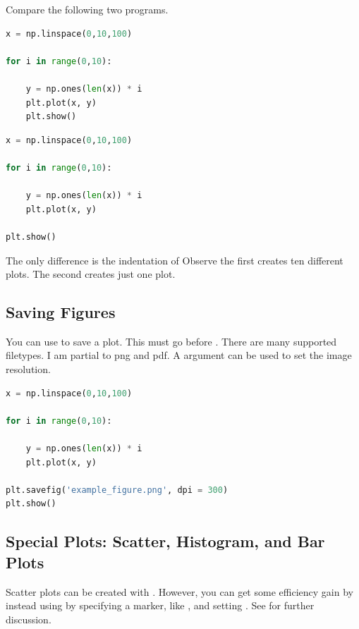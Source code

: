 Compare the following two programs.

\begin{lstlisting}[language = Python]
x = np.linspace(0,10,100)

for i in range(0,10):
    
    y = np.ones(len(x)) * i
    plt.plot(x, y)
    plt.show()
\end{lstlisting}

\begin{lstlisting}[language = Python]
x = np.linspace(0,10,100)

for i in range(0,10):
    
    y = np.ones(len(x)) * i
    plt.plot(x, y)

plt.show()
\end{lstlisting}

The only difference is the indentation of  Observe the first creates ten different plots. The second creates just one plot. 


\subsection{Saving Figures}

You can use  to save a plot. This must go before . There are many supported filetypes. I am partial to png and pdf. A  argument can be used to set the image resolution. 

\begin{lstlisting}[language = Python]
x = np.linspace(0,10,100)

for i in range(0,10):
    
    y = np.ones(len(x)) * i
    plt.plot(x, y)

plt.savefig('example_figure.png', dpi = 300)
plt.show()
\end{lstlisting}


\subsection{Special Plots: Scatter, Histogram, and Bar Plots}

Scatter plots can be created with . However, you can get some efficiency gain by instead using  by specifying a marker, like , and setting . See \cite{vanderplas2016python} for further discussion. 

\medskip

